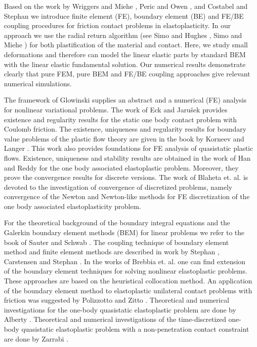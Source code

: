 Based on the work by Wriggers and Miehe \cite{WrMi94}, Peric and Owen \cite{PeOw98}, and Costabel and Stephan \cite{CoSt88,CoSt90} we introduce finite element (FE), boundary element (BE) and FE/BE coupling procedures for friction contact problems in elastoplasticity. In our approach we use the radial return algorithm (see Simo and Hughes \cite{SiHu98}, Simo and Miehe \cite{SiMi92}) for both plastification of the material and contact. Here, we study small deformations and therefore can model the linear elastic parts by standard BEM with the linear elastic fundamental solution. Our numerical results demonstrate clearly that   pure FEM,  pure BEM and FE/BE coupling approaches give relevant numerical simulations. 

 The framework of Glowinski \cite{Glo2000} supplies an abstract and a numerical (FE)  analysis  for nonlinear variational problems.  The work of Eck and Jaru\v{s}ek \cite{EckJa98} provides existence and regularity results for the static one body contact problem with Coulomb friction. The existence, uniqueness and regularity results for boundary value problems of the plastic flow theory are given in the book by Korneev and Langer \cite{KoLa84}. This work also provides foundations for FE analysis of quasistatic plastic flows.  Existence, uniqueness and stability results are obtained in the work of Han and Reddy \cite{WeRe99} for the one body associated elastoplastic problem. Moreover, they prove the convergence results for discrete  versions. The work of Blaheta et. al.  \cite{Bl97,BlAx97,AxBlKo97} is devoted to the investigation of convergence of discretized problems, namely convergence of the Newton and Newton-like methods for FE discretization of the one body associated elastoplasticity problem. 

 For the theoretical background of the boundary integral equations and  the Galerkin boundary element methods (BEM) for linear problems we refer to the book of Sauter and Schwab \cite{SaSch04}. The coupling technique of boundary element method and finite element methods are described in work by Stephan \cite{Ste04}, Carstensen and Stephan \cite{CaSt95}. In the works of Brebbia et. al.  \cite{Br80,BrWa80,Br81,Br83} one can find extension of the boundary element techniques for solving nonlinear elastoplastic problems. These approaches are based on  the heuristical collocation method. An application of the boundary element method to  elastoplastic unilateral contact problems with friction was suggested by  Polizzotto and Zitto \cite{PoZi98}. Theoretical and numerical investigations for the one-body quasistatic elastoplastic problem are done by Alberty \cite{AlbertyPhD}. Theoretical and numerical investigations of the time-discretized one-body quasistatic elastoplastic  problem with a non-penetration contact constraint are done by Zarrabi \cite{ZarrabiPhD}.

